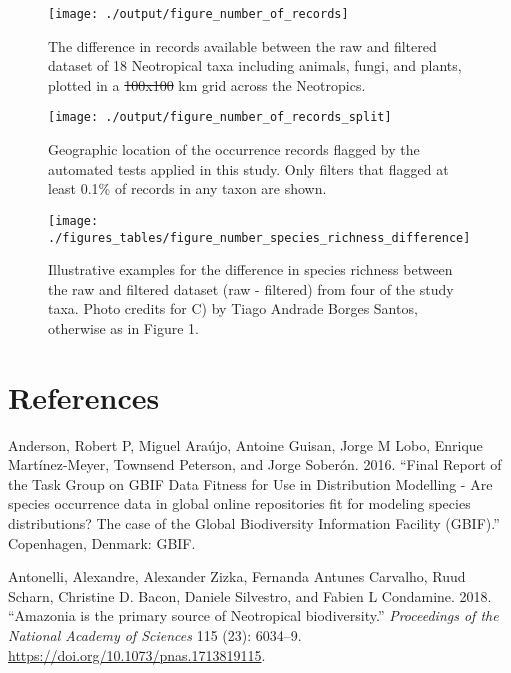 \documentclass[fleqn,10pt,lineno]{wlpeerj} %
\providecommand{\DIFaddtex}[1]{{\protect\color{blue}\uwave{#1}}} %
\providecommand{\DIFdeltex}[1]{{\protect\color{red}\sout{#1}}}                      %
\providecommand{\DIFaddFL}[1]{\DIFadd{#1}} %
\providecommand{\DIFdelFL}[1]{\DIFdel{#1}} %
\providecommand{\DIFaddbeginFL}{} %
\providecommand{\DIFaddendFL}{} %
\providecommand{\DIFdelbeginFL}{} %
\providecommand{\DIFdelendFL}{} %
\providecommand{\DIFadd}[1]{\texorpdfstring{\DIFaddtex{#1}}{#1}} %
\providecommand{\DIFdel}[1]{\texorpdfstring{\DIFdeltex{#1}}{}} %
\begin{document}
\begin{figure}
\texttt{[image: ./output/figure\_number\_of\_records]} \caption{The difference in records available between the raw and filtered dataset of 18 Neotropical taxa including animals, fungi, and plants, plotted in a \DIFdelbeginFL \DIFdelFL{100x100 }\DIFdelendFL \DIFaddbeginFL \DIFaddFL{100 x 100 }\DIFaddendFL km grid across the Neotropics.}\label{fig:total}
\end{figure}

\begin{figure}
\texttt{[image: ./output/figure\_number\_of\_records\_split]} \caption{Geographic location of the occurrence records flagged by the automated tests applied in this study. Only filters that flagged at least 0.1\% of records in any taxon are shown.}\label{fig:split}
\end{figure}

\begin{figure}
\texttt{[image: ./figures\_tables/figure\_number\_species\_richness\_difference]} \caption{Illustrative examples for the difference in species richness between the raw and filtered dataset (raw - filtered) from four of the study taxa. Photo credits for C) by Tiago Andrade Borges Santos, otherwise as in Figure 1.}\label{fig:speciesrichness}
\end{figure}

\newpage{}

\hypertarget{references}{%
\section*{References}\label{references}}

\hypertarget{refs}{}
\leavevmode\hypertarget{ref-Anderson2016}{}%
Anderson, Robert P, Miguel Araújo, Antoine Guisan, Jorge M Lobo, Enrique Martínez-Meyer, Townsend Peterson, and Jorge Soberón. 2016. ``Final Report of the Task Group on GBIF Data Fitness for Use in Distribution Modelling - Are species occurrence data in global online repositories fit for modeling species distributions? The case of the Global Biodiversity Information Facility (GBIF).'' Copenhagen, Denmark: GBIF.

\leavevmode\hypertarget{ref-Antonelli2018}{}%
Antonelli, Alexandre, Alexander Zizka, Fernanda Antunes Carvalho, Ruud Scharn, Christine D. Bacon, Daniele Silvestro, and Fabien L Condamine. 2018. ``Amazonia is the primary source of Neotropical biodiversity.'' \emph{Proceedings of the National Academy of Sciences} 115 (23): 6034--9. \url{https://doi.org/10.1073/pnas.1713819115}.
\end{document}
